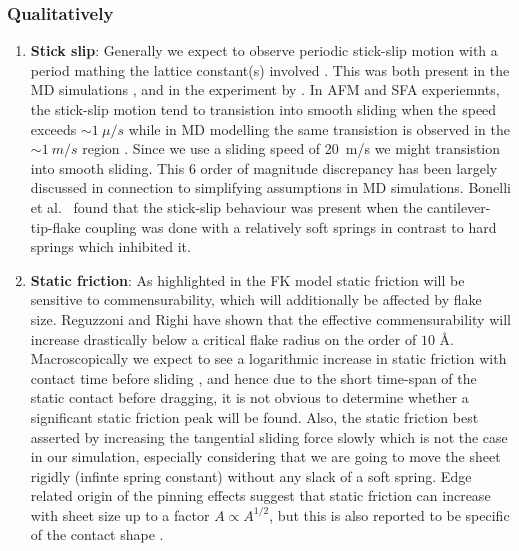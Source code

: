 \subsubsection{Qualitatively}
\begin{enumerate}
  \item \textbf{Stick slip}: Generally we expect to observe periodic stick-slip motion with a period mathing the lattice constant(s) involved \cite{mo_friction_2009}. This was both present in the MD simulations \cite{zhu_study_2018}, \cite{ma12091425} and in the experiment by \cite{DIENWIEBEL2005197}. In AFM and SFA experiemnts, the stick-slip motion tend to transistion into smooth sliding when the speed exceeds $\sim \SI{1}{\mu/s}$ while in MD modelling the same transistion is observed in the $\sim \SI{1}{m/s}$ region \cite{Manini_2016}. Since we use a sliding speed of \SI{20}{m/s} we might transistion into smooth sliding. This 6 order of magnitude discrepancy has been largely discussed in connection to simplifying assumptions in MD simulations. Bonelli et al.\ \cite{bonelli_atomistic_2009} found that the stick-slip behaviour was present when the cantilever-tip-flake coupling was done with a relatively soft springs in contrast to hard springs which inhibited it.   

  \item \textbf{Static friction}: As highlighted in the FK model static friction
  will be sensitive to commensurability, which will additionally be affected by
  flake size. Reguzzoni and Righi \cite{PhysRevB.85.201412} have shown that the
  effective commensurability will increase drastically below a critical flake
  radius on the order of $10$ Å. Macroscopically we expect to see a logarithmic
  increase in static friction with contact time before sliding
  \cite{dieterich_1972}, and hence due to the short time-span of the static
  contact before dragging, it is not obvious to determine whether a significant
  static friction peak will be found. Also, the static friction best asserted by
  increasing the tangential sliding force slowly which is not the case in our
  simulation, especially considering that we are going to move the sheet rigidly
  (infinte spring constant) without any slack of a soft spring. Edge related
  origin of the pinning effects suggest that static friction can increase with
  sheet size up to a factor $A\propto A^{1/2}$, but this is also reported to be specific of the contact shape \cite{Manini_2016}.
  


\end{enumerate}
